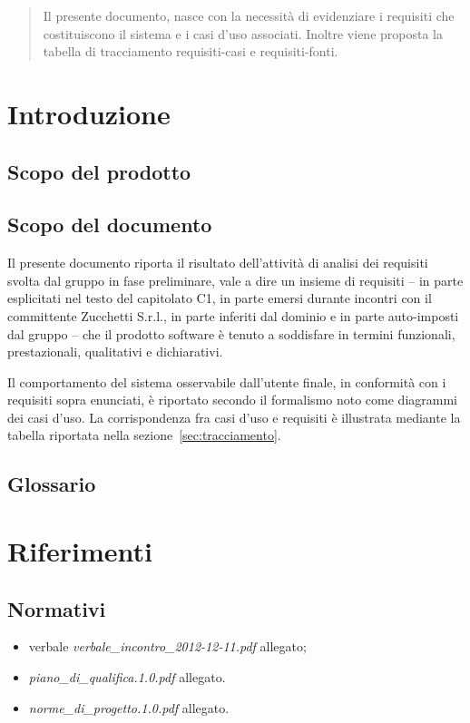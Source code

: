 
\begin{abstract}
Il presente documento, nasce con la necessità di evidenziare i requisiti che costituiscono il sistema e i casi d'uso associati. Inoltre viene proposta la tabella di tracciamento requisiti-casi e requisiti-fonti.
\end{abstract}

\newpage

\section{Introduzione}
\subsection{Scopo del prodotto}
\purpose

\subsection{Scopo del documento}
Il presente documento riporta il risultato dell'attività di analisi dei requisiti svolta dal gruppo \team{} in fase preliminare, vale a dire un insieme di requisiti -- in parte esplicitati nel testo del capitolato C1, in parte emersi durante incontri con il committente Zucchetti S.r.l., in parte inferiti dal dominio e in parte auto-imposti dal gruppo -- che il prodotto software è tenuto a soddisfare in termini funzionali, prestazionali, qualitativi e dichiarativi.

Il comportamento del sistema osservabile dall'utente finale, in conformità con i requisiti sopra enunciati, è riportato secondo il formalismo noto come diagrammi dei casi d'uso. La corrispondenza fra casi d'uso e requisiti è illustrata mediante la tabella riportata nella sezione~\ref{sec:tracciamento}.

\subsection{Glossario}
\glossaryIntro

\clearpage
\section{Riferimenti}

\subsection{Normativi}
\begin{itemize}
\item[] verbale \textit{verbale\_incontro\_2012-12-11.pdf} allegato;
\item[] \textit{piano\_di\_qualifica.1.0.pdf} allegato.
\item[] \textit{norme\_di\_progetto.1.0.pdf} allegato.
\end{itemize}

